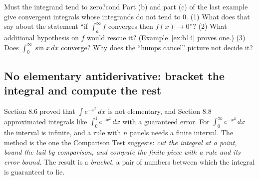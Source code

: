 \documentclass[11pt]{article}
\begin{document}
\begin{think}{Must the integrand tend to zero?}{cond}
Part (b) and part (c) of the last example give convergent integrals whose integrands do not tend to $0$. (1) What does that say about the statement ``if $\int_a^\infty f$ converges then $f(x)\to0$''? (2) What additional hypothesis on $f$ would rescue it? (Example~\ref{ex:b14} proves one.) (3) Does $\int_0^\infty\sin x\,dx$ converge? Why does the ``humps cancel'' picture not decide it?
\end{think}

\subsection*{No elementary antiderivative: bracket the integral and compute the rest}

Section 8.6 proved that $\int e^{-x^2}\,dx$ is not elementary, and Section 8.8 approximated integrals like $\int_0^1e^{-x^2}\,dx$ with a guaranteed error. For $\int_0^\infty e^{-x^2}\,dx$ the interval is infinite, and a rule with $n$ panels needs a finite interval. The method is the one the Comparison Test suggests: \emph{cut the integral at a point, bound the tail by comparison, and compute the finite piece with a rule and its error bound.} The result is a \emph{bracket}, a pair of numbers between which the integral is guaranteed to lie.
\end{document}
